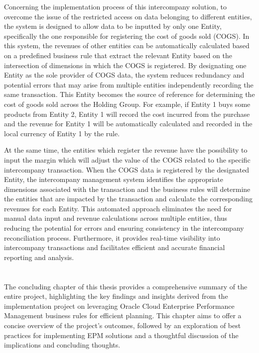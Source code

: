 \documentclass[12pt,a4paper,openright,twoside]{book}
\begin{document}
Concerning the implementation process of this intercompany solution, to overcome the issue of the restricted access on data belonging to different entities, the system is designed to allow data to be inputted by only one Entity, specifically the one responsible for registering the cost of goods sold (COGS).
%
In this system, the revenues of other entities can be automatically calculated based on a predefined business rule that extract the relevant Entity based on the intersection of dimensions in which the COGS is registered.
%
By designating one Entity as the sole provider of COGS data, the system reduces redundancy and potential errors that may arise from multiple entities independently recording the same transaction. 
%
This Entity becomes the source of reference for determining the cost of goods sold across the Holding Group.
%
For example, if Entity 1 buys some products from Entity 2, Entity 1 will record the cost incurred from the purchase and the revenue for Entity 1 will be automatically calculated and recorded in the local currency of Entity 1 by the rule.

At the same time, the entities which register the revenue have the possibility to input the margin which will adjust the value of the COGS related to the specific intercompany transaction.
%
When the COGS data is registered by the designated Entity, the intercompany management system identifies the appropriate dimensions associated with the transaction and the business rules will determine the entities that are impacted by the transaction and calculate the corresponding revenues for each Entity.
%
This automated approach eliminates the need for manual data input and revenue calculations across multiple entities, thus reducing the potential for errors and ensuring consistency in the intercompany reconciliation process. 
%
Furthermore, it provides real-time visibility into intercompany transactions and facilitates efficient and accurate financial reporting and analysis.

\chapter{\conclusionsname}
\label{chap:conclusions}

The concluding chapter of this thesis provides a comprehensive summary of the entire project, highlighting the key findings and insights derived from the implementation project on leveraging Oracle Cloud Enterprise Performance Management business rules for efficient planning. 
%
This chapter aims to offer a concise overview of the project's outcomes, followed by an exploration of best practices for implementing EPM solutions and a thoughtful discussion of the implications and concluding thoughts.
\end{document}
